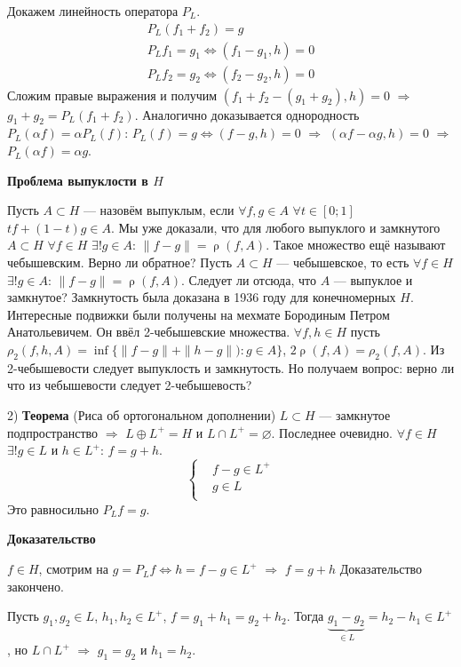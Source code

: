 \documentclass[12pt]{article}
\DeclareMathOperator{\rh}{\rho}
\begin{document}
Докажем линейность оператора $P_L$.
\begin{gather*}
P_L(f_1 + f_2) = g\\
P_Lf_1 = g_1 \Leftrightarrow (f_1 - g_1, h) = 0\\
P_Lf_2 = g_2 \Leftrightarrow (f_2 - g_2, h) = 0
\end{gather*}
Сложим правые выражения и получим $(f_1 + f_2 - (g_1 + g_2), h) = 0$ $\Rightarrow$ $g_1 + g_2 = P_L(f_1 + f_2)$.
Аналогично доказывается однородность $P_L(\alpha f) = \alpha P_L(f)$: $P_L(f) = g \Leftrightarrow (f - g, h) = 0$ $\Rightarrow$
$(\alpha f - \alpha g, h) = 0$ $\Rightarrow$ $P_L(\alpha f) = \alpha g$.

\textbf{Проблема выпуклости в $H$}

Пусть $A \subset H$ --- назовём выпуклым, если $\forall f,g \in A$ $\forall t \in [0;1]$ $t f + (1 - t) g \in A$.
Мы уже доказали, что для любого выпуклого и замкнутого $A \subset H$ $\forall f \in H$ $\exists! g \in A$: $\|f - g\| = \rh(f, A)$.
Такое множество ещё называют чебышевским.
Верно ли обратное? Пусть $A \subset H$ --- чебышевское, то есть $\forall f \in H$ $\exists! g \in A$: $\|f - g\| = \rh(f,A)$. 
Следует ли отсюда, что $A$ --- выпуклое и замкнутое?
Замкнутость была доказана в 1936 году для конечномерных $H$.
Интересные подвижки были получены на мехмате Бородиным Петром Анатольевичем.
Он ввёл 2-чебышевские множества.
$\forall f,h \in H$ пусть $\rho_2(f, h, A) = \inf\{\|f - g\| + \|h - g\|):g \in A\}$, $2\rh(f, A) = \rho_2(f, A)$.
Из 2-чебышевости следует выпуклость и замкнутость.
Но получаем вопрос: верно ли что из чебышевости следует 2-чебышевость?

2) \textbf{Теорема} (Риса об ортогональном дополнении)
$L \subset H$ --- замкнутое подпространство $\Rightarrow$ $L \oplus L^+ = H$ и $L \cap L^+ = \varnothing$.
Последнее очевидно. 
$\forall f \in H$ $\exists! g \in L$ и $h \in L^+$: $f = g + h$.
$$
\left\{
\begin{aligned}
&f - g \in L^{+}\\
&g \in L\\
\end{aligned}
\right.
$$
Это равносильно $P_Lf = g$.

\textbf{Доказательство}

$f \in H$, смотрим на $g = P_Lf \Leftrightarrow h = f - g \in L^+$ $\Rightarrow$ $f = g + h$ Доказательство закончено.

Пусть $g_1,g_2 \in L$, $h_1, h_2 \in L^+$,  $f = g_1 + h_1 = g_2 + h_2$.
Тогда $\underbrace{g_1 - g_2}_{\in L} = h_2 - h_1 \in L^+$, но $L \cap L^+$ $\Rightarrow$ $g_1 = g_2$ и $h_1 = h_2$.
\end{document}
